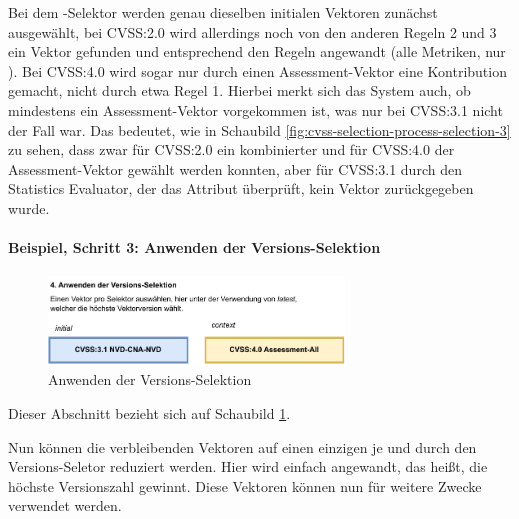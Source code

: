 Bei dem -Selektor werden genau dieselben initialen Vektoren zunächst ausgewählt, bei CVSS:2.0 wird allerdings noch von den anderen Regeln 2 und 3 ein Vektor gefunden und entsprechend den Regeln angewandt (alle Metriken, nur ).
Bei CVSS:4.0 wird sogar nur durch einen Assessment-Vektor eine Kontribution gemacht, nicht durch etwa Regel 1.
Hierbei merkt sich das System auch, ob mindestens ein Assessment-Vektor vorgekommen ist, was nur bei CVSS:3.1 nicht der Fall war.
Das bedeutet, wie in Schaubild \ref{fig:cvss-selection-process-selection-3} zu sehen, dass zwar für CVSS:2.0 ein kombinierter und für CVSS:4.0 der Assessment-Vektor gewählt werden konnten, aber für CVSS:3.1 durch den Statistics Evaluator, der das  Attribut überprüft, kein Vektor zurückgegeben wurde.

\paragraph{Beispiel, Schritt 3: Anwenden der Versions-Selektion} \label{par:projektbericht-loesungsweg-cvss-selection-example-step-4}

\begin{figure}[htbp] %
    \centering
    \includegraphics[width=0.7\textwidth, keepaspectratio]{res/grafiken/cvss-selection-process-selection-4}
    \caption{Anwenden der Versions-Selektion}
    \label{fig:cvss-selection-process-selection-4}
\end{figure}

Dieser Abschnitt bezieht sich auf Schaubild \ref{fig:cvss-selection-process-selection-4}.

Nun können die verbleibenden Vektoren auf einen einzigen je  und  durch den Versions-Seletor reduziert werden.
Hier wird einfach  angewandt, das heißt, die höchste Versionszahl gewinnt.
Diese Vektoren können nun für weitere Zwecke verwendet werden.
